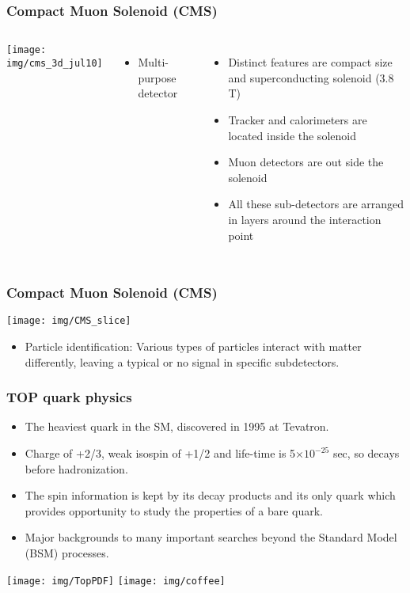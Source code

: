 \documentclass{beamer}
\begin{document}
\begin{frame}
\frametitle{Compact Muon Solenoid (CMS)}
\begin{columns}
\texttt{[image: img/cms\_3d\_jul10]}
\begin{itemize}
\item Multi-purpose detector
\end{itemize}
\begin{itemize}
\item Distinct features are compact size and superconducting solenoid (3.8 T)
\item Tracker and calorimeters are located inside the solenoid
\item Muon detectors are out side the solenoid
\item All these sub-detectors are arranged in layers around the interaction point
\end{itemize}
\end{columns}
\end{frame}
\begin{frame}
\frametitle{Compact Muon Solenoid (CMS)}
\texttt{[image: img/CMS\_slice]}
\begin{itemize}
\item Particle identification: Various types of particles interact with matter differently,
leaving a typical or no signal in specific subdetectors.
\end{itemize}
\end{frame}
\begin{frame}
\frametitle{TOP quark physics}
\begin{itemize}
\item The heaviest quark in the SM, discovered in 1995 at Tevatron.
\item Charge of +2/3, weak isospin of +1/2 and life-time is 5$\times10^{-25}$ sec, so decays before hadronization.
\item The spin information is kept by its decay products and its only quark which provides opportunity to study the properties of a bare quark.
\item Major backgrounds to many important searches beyond the Standard Model (BSM) processes.
\end{itemize}
\texttt{[image: img/TopPDF]}
\texttt{[image: img/coffee]}
\end{frame}
\end{document}
